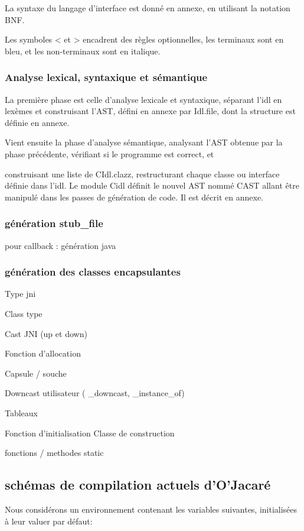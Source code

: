 \documentclass[a4paper, 11pt, notitlepage]{article}
\begin{document}
La syntaxe du langage d'interface est donné en annexe, en utilisant la
notation BNF.

Les symboles < et > encadrent des règles optionnelles,
les terminaux sont en bleu, et les non-terminaux sont en italique.


\subsubsection{Analyse lexical, syntaxique et sémantique}
La première phase est celle d'analyse lexicale et syntaxique,
séparant l'idl en lexèmes et construisant l'AST, défini en annexe par Idl.file,
dont la structure est définie en annexe.

Vient ensuite la phase d'analyse sémantique, analysant l'AST obtenue par la
phase précédente, vérifiant si le programme est correct, et

construisant une liste de CIdl.clazz, restructurant chaque classe ou interface définie dans l'idl. 
Le module Cidl définit le nouvel AST nommé CAST allant être manipulé dans les passes de
génération de code. Il est décrit en annexe.

\subsubsection{génération stub\_file}
pour callback : génération java

\subsubsection{génération des classes encapsulantes}

Type jni

Class type

Cast JNI (up et down)

Fonction d'allocation

Capsule / souche

Downcast utilisateur (
\_downcast,
\_instance\_of)

Tableaux

Fonction d'initialisation
Classe de construction

fonctions / methodes static




\subsection{schémas de compilation actuels d'O'Jacaré}

\noindent
Nous considérons un environnement contenant les  variables suivantes, initialisées à leur valuer par défaut: 
\end{document}
